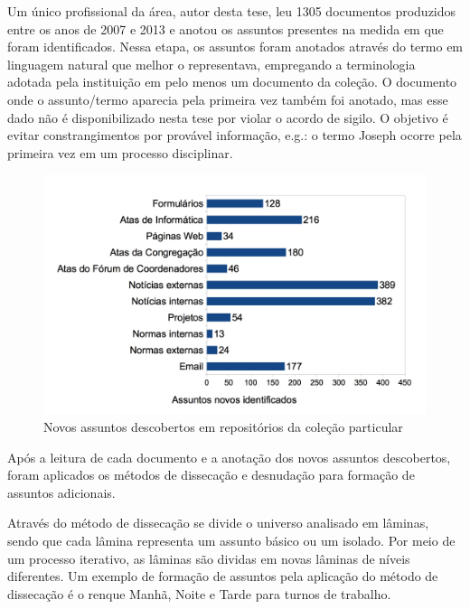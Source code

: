 
Um único profissional da área, autor desta tese, leu 1305 documentos produzidos entre os anos de 2007 e 2013 e anotou os assuntos presentes na medida em que foram identificados. Nessa etapa, os assuntos foram anotados através do termo em linguagem natural que melhor o representava, empregando a terminologia adotada pela instituição em pelo menos um documento da coleção. O documento onde o assunto/termo aparecia pela primeira vez também foi anotado, mas esse dado não é disponibilizado nesta tese por violar o acordo de sigilo. O objetivo é evitar constrangimentos por provável informação, e.g.: o termo Joseph ocorre pela primeira vez em um processo disciplinar.

\begin{figure}
	\caption{\label{fig:assuntosIdentificadosParticular}Novos assuntos descobertos em repositórios da coleção particular}

	\centering
		\includegraphics[width=1.0\textwidth]{fig/assuntosIdentificadosParticular.jpg}

\end{figure}

Após a leitura de cada documento e a anotação dos novos assuntos descobertos, foram aplicados os métodos de dissecação e desnudação para formação de assuntos adicionais. 

Através do método de dissecação se divide o universo analisado em lâminas, sendo que cada lâmina representa um assunto básico ou um isolado. Por meio de um processo iterativo, as lâminas são dividas em novas lâminas de níveis diferentes. Um exemplo de formação de assuntos pela aplicação do método de dissecação é o renque Manhã, Noite e Tarde para turnos de trabalho. 

